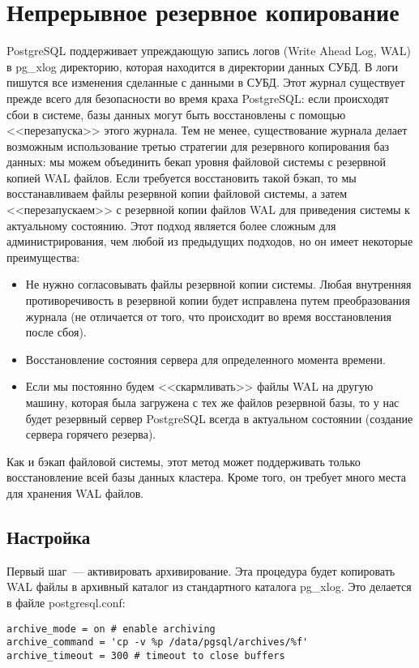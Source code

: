 \section{Непрерывное резервное копирование}
PostgreSQL поддерживает упреждающую запись логов (Write Ahead Log, WAL) в pg\_xlog директорию, которая находится в директории 
данных СУБД. 
В логи пишутся все изменения сделанные с данными в СУБД. Этот журнал существует прежде всего для безопасности во 
время краха PostgreSQL: если происходят сбои в системе, базы данных могут быть восстановлены с помощью <<перезапуска>> этого 
журнала. Тем не менее, существование журнала делает возможным использование третью стратегии для резервного копирования 
баз данных: мы можем объединить бекап уровня файловой системы с резервной копией WAL файлов. Если требуется восстановить такой бэкап, то 
мы восстанавливаем файлы резервной копии файловой системы, а затем <<перезапускаем>> с резервной копии файлов WAL для приведения 
системы к актуальному состоянию. Этот подход является более сложным для администрирования, чем любой из предыдущих подходов, 
но он имеет некоторые преимущества:
\begin{itemize}
\item Не нужно согласовывать файлы резервной копии системы. Любая внутренняя противоречивость в резервной копии будет исправлена 
путем преобразования журнала (не отличается от того, что происходит во время восстановления после сбоя). 
\item Восстановление состояния сервера для определенного момента времени.
\item Если мы постоянно будем <<скармливать>> файлы WAL на другую машину, которая была загружена с тех же файлов резервной базы, 
то у нас будет резервный сервер PostgreSQL всегда в актуальном состоянии (создание сервера горячего резерва).
\end{itemize}

Как и бэкап файловой системы, этот метод может поддерживать только восстановление всей базы данных кластера. Кроме того, он требует 
много места для хранения WAL файлов.

\subsection{Настройка}
Первый шаг~--- активировать архивирование. Эта процедура будет копировать WAL файлы в архивный каталог из 
стандартного каталога pg\_xlog. Это делается в файле postgresql.conf:
\begin{lstlisting}[label=lst:backups15,caption=Настройка архивирования]
archive_mode = on # enable archiving
archive_command = 'cp -v %p /data/pgsql/archives/%f'
archive_timeout = 300 # timeout to close buffers
\end{lstlisting}

